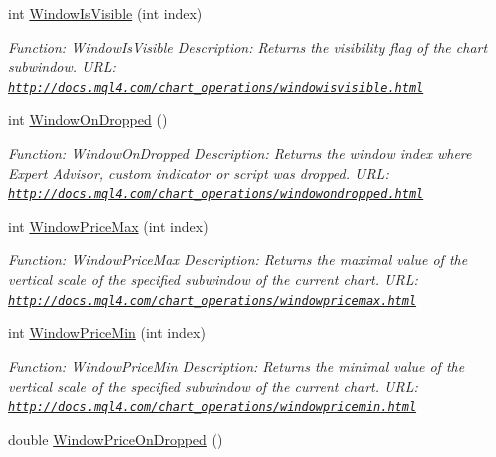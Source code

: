\begin{DoxyCompactItemize}
int \hyperlink{class_m_q_l4_c_sharp_1_1_base_1_1_m_q_l_base_a429343f1dd9293216fbbcbd64259b780}{Window\+Is\+Visible} (int index)
\begin{DoxyCompactList}\small\item\em Function\+: Window\+Is\+Visible Description\+: Returns the visibility flag of the chart subwindow. U\+RL\+: \href{http://docs.mql4.com/chart_operations/windowisvisible.html}{\tt http\+://docs.\+mql4.\+com/chart\+\_\+operations/windowisvisible.\+html} \end{DoxyCompactList}\item 
int \hyperlink{class_m_q_l4_c_sharp_1_1_base_1_1_m_q_l_base_aed0e3d99c39abd16d9bfee8dd0638c56}{Window\+On\+Dropped} ()
\begin{DoxyCompactList}\small\item\em Function\+: Window\+On\+Dropped Description\+: Returns the window index where Expert Advisor, custom indicator or script was dropped. U\+RL\+: \href{http://docs.mql4.com/chart_operations/windowondropped.html}{\tt http\+://docs.\+mql4.\+com/chart\+\_\+operations/windowondropped.\+html} \end{DoxyCompactList}\item 
int \hyperlink{class_m_q_l4_c_sharp_1_1_base_1_1_m_q_l_base_a987d9a71b14d978ad04b9e04e7fe5eae}{Window\+Price\+Max} (int index)
\begin{DoxyCompactList}\small\item\em Function\+: Window\+Price\+Max Description\+: Returns the maximal value of the vertical scale of the specified subwindow of the current chart. U\+RL\+: \href{http://docs.mql4.com/chart_operations/windowpricemax.html}{\tt http\+://docs.\+mql4.\+com/chart\+\_\+operations/windowpricemax.\+html} \end{DoxyCompactList}\item 
int \hyperlink{class_m_q_l4_c_sharp_1_1_base_1_1_m_q_l_base_a5eaae413a3d2794805f9c6cedd1ba0a1}{Window\+Price\+Min} (int index)
\begin{DoxyCompactList}\small\item\em Function\+: Window\+Price\+Min Description\+: Returns the minimal value of the vertical scale of the specified subwindow of the current chart. U\+RL\+: \href{http://docs.mql4.com/chart_operations/windowpricemin.html}{\tt http\+://docs.\+mql4.\+com/chart\+\_\+operations/windowpricemin.\+html} \end{DoxyCompactList}\item 
double \hyperlink{class_m_q_l4_c_sharp_1_1_base_1_1_m_q_l_base_a15e8b73413eb5f10f2951ab80b038b9e}{Window\+Price\+On\+Dropped} ()

\end{DoxyCompactItemize}
